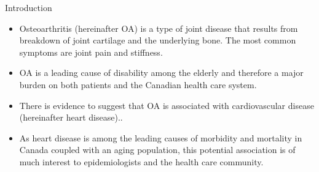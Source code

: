 \begin{frame}{Introduction}
    \begin{itemize}
        \item Osteoarthritis (hereinafter OA) is a type of joint disease that results from breakdown of joint cartilage and the underlying bone. The most common symptoms are joint pain and stiffness.\cite{Rahman_2014} 
        \item OA is a leading cause of disability among the elderly and therefore a major burden on both patients and the Canadian health care system. \cite{doi:10.1002/art.33467} 
        \item There is evidence to suggest that OA is associated with cardiovascular disease (hereinafter heart disease).\cite{singh2002prevalence}. 
        \item As heart disease is among the leading causes of morbidity and mortality in Canada coupled with an aging population, this potential association is of much interest to epidemiologists and the health care community.
    \end{itemize}
\end{frame}